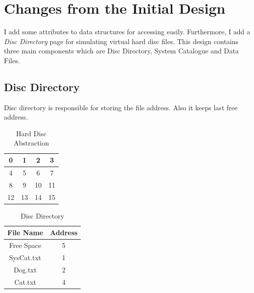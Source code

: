 \documentclass[12pt,a4paper]{article}
\begin{document}
\section{Changes from the Initial Design}
    I add some attributes to data structures for accessing easily. Furthermore, I add a \emph{Disc Directory} page for simulating virtual hard disc files.
    This design contains three main components which are Disc Directory, System Catalogue and  Data Files.
    \subsection{Disc Directory}
        Disc directory is responsible for storing the file address. Also it keeps last free address. \\

        \begin{table}[h!]
                \begin{center}
                    \begin{tabular}{ | c | c | c | c | }
                    \hline
                    0 & 1 & 2 & 3 \\
                    \hline
                    4 & 5 & 6 & 7 \\
                    \hline
                    8 & 9 & 10 & 11 \\
                    \hline
                    12 & 13 & 14 & 15 \\
                    \hline
                    \end{tabular}
                \end{center}
            \caption{Hard Disc Abstraction}
            \label{table:1}
        \end{table}

        \begin{table}[h!]
                \begin{center}
                    \begin{tabular}{ | c | c| }
                    \hline
                    File Name & Address \\
                    \hline
                    \hline
                    Free Space & 5 \\
                    \hline
                    SysCat.txt & 1 \\
                    \hline
                    Dog.txt & 2 \\
                    \hline
                    Cat.txt & 4 \\
                    \hline
                    \end{tabular}
                \end{center}
            \caption{Disc Directory}
            \label{table:2}
        \end{table}
\end{document}
